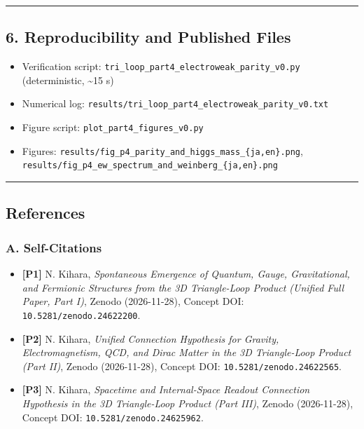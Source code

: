 \documentclass[
  a4paper,
]{article}
\providecommand{\tightlist}{%
  \setlength{\itemsep}{0pt}\setlength{\parskip}{0pt}}
\begin{document}
\begin{center}\rule{0.5\linewidth}{0.5pt}\end{center}

\subsection{6. Reproducibility and Published
Files}\label{reproducibility-and-published-files}

\begin{itemize}
\tightlist
\item
  Verification script:
  \texttt{tri\_loop\_part4\_electroweak\_parity\_v0.py} (deterministic,
  \textasciitilde15 s)
\item
  Numerical log:
  \texttt{results/tri\_loop\_part4\_electroweak\_parity\_v0.txt}
\item
  Figure script: \texttt{plot\_part4\_figures\_v0.py}
\item
  Figures:
  \texttt{results/fig\_p4\_parity\_and\_higgs\_mass\_\{ja,en\}.png},
  \texttt{results/fig\_p4\_ew\_spectrum\_and\_weinberg\_\{ja,en\}.png}
\end{itemize}

\begin{center}\rule{0.5\linewidth}{0.5pt}\end{center}

\subsection{References}\label{references}

\subsubsection{A. Self-Citations}\label{a.-self-citations}

\begin{itemize}
\tightlist
\item
  \textbf{{[}P1{]}} N. Kihara, \emph{Spontaneous Emergence of Quantum,
  Gauge, Gravitational, and Fermionic Structures from the 3D
  Triangle-Loop Product (Unified Full Paper, Part I)}, Zenodo
  (2026-11-28), Concept DOI: \texttt{10.5281/zenodo.24622200}.
\item
  \textbf{{[}P2{]}} N. Kihara, \emph{Unified Connection Hypothesis for
  Gravity, Electromagnetism, QCD, and Dirac Matter in the 3D
  Triangle-Loop Product (Part II)}, Zenodo (2026-11-28), Concept DOI:
  \texttt{10.5281/zenodo.24622565}.
\item
  \textbf{{[}P3{]}} N. Kihara, \emph{Spacetime and Internal-Space
  Readout Connection Hypothesis in the 3D Triangle-Loop Product (Part
  III)}, Zenodo (2026-11-28), Concept DOI:
  \texttt{10.5281/zenodo.24625962}.
\end{itemize}
\end{document}

